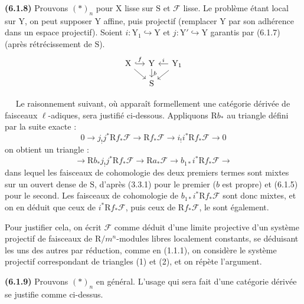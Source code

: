 \documentclass[11pt,leqno]{article}
\newcommand{\Page}[1]{\ifvmode\noindent\else\unskip\ \fi{\footnotesize\textcolor{gray}{[p.\,#1]}}\ \ignorespaces}
\begin{document}
\textbf{(6.1.8)} Prouvons \((*)_n\) pour \(\mathrm{X}\) lisse sur
\(\mathrm{S}\) et \(\mathscr{F}\) lisse. Le problème étant local
sur \(\mathrm{Y}\), on peut supposer \(\mathrm{Y}\) affine, puis
projectif (remplacer \(\mathrm{Y}\) par son adhérence dans un espace
projectif). Soient \(i:\mathrm{Y}_1\hookrightarrow\mathrm{Y}\) et
\(j:\mathrm{Y}'\hookrightarrow\mathrm{Y}\) garantis par (6.1.7)
(après rétrécissement de \(\mathrm{S}\)).
\[
\begin{tikzcd}[column sep=small,row sep=small]
\mathrm{X} \arrow[r,hook,"f"] \arrow[dr] &
\mathrm{Y} \arrow[d,"b"] &
\mathrm{Y}_1 \arrow[l,"i"'] \arrow[dl] \\
& \mathrm{S} &
\end{tikzcd}
\]

\Page{245}
Le raisonnement suivant, où apparaît formellement une catégorie
dérivée de faisceaux \(\ell\)-adiques, sera justifié ci-dessous.
Appliquons \(\mathrm{R}b_*\) au triangle défini par la suite exacte :
\[
\tag*{(1)}
0\to j_!j^*\mathrm{R}f_*\mathscr{F}
\to\mathrm{R}f_*\mathscr{F}
\to i_!i^*\mathrm{R}f_*\mathscr{F}\to0
\]
on obtient un triangle :
\[
\tag*{(2)}
\to\mathrm{R}b_*j_!j^*\mathrm{R}f_*\mathscr{F}
\to\mathrm{R}a_*\mathscr{F}
\to b_{1*}i^*\mathrm{R}f_*\mathscr{F}\to
\]
dans lequel les faisceaux de cohomologie des deux premiers termes
sont mixtes sur un ouvert dense de \(\mathrm{S}\), d’après (3.3.1)
pour le premier (\(b\) est propre) et (6.1.5) pour le second.
Les faisceaux de cohomologie de \(b_{1*}i^*\mathrm{R}f_*\mathscr{F}\)
sont donc mixtes, et on en déduit que ceux de
\(i^*\mathrm{R}f_*\mathscr{F}\), puis ceux de
\(\mathrm{R}f_*\mathscr{F}\), le sont également.

Pour justifier cela, on écrit \(\mathscr{F}\) comme déduit d’une
limite projective d’un système projectif de faisceaux de
\(\mathrm{R}/m^n\)-modules libres localement constants, se déduisant
les uns des autres par réduction, comme en (1.1.1), on considère le
système projectif correspondant de triangles (1) et (2), et on
répète l’argument.

\textbf{(6.1.9)} Prouvons \((*)_n\) en général. L’usage qui sera fait
d’une catégorie dérivée se justifie comme ci-dessus.
\end{document}
